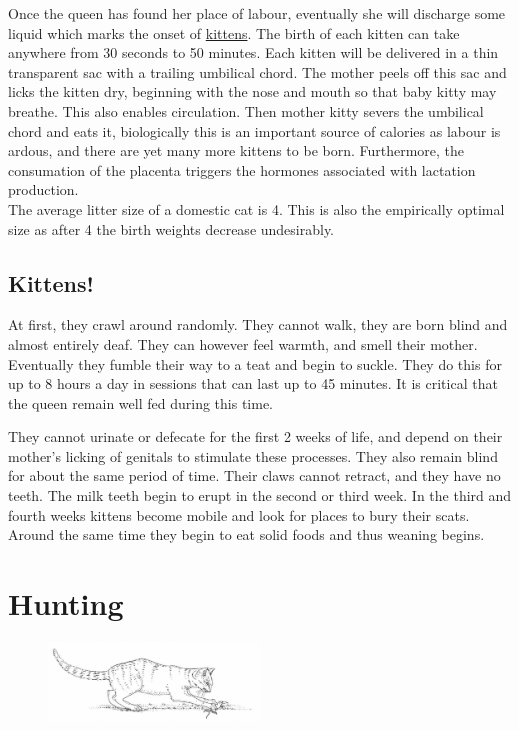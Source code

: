 \documentclass{article}
\begin{document}
\noindent{}Once the queen has found her place of labour, eventually she will discharge some liquid which marks the onset of \hyperref[sec:Kittens]{kittens}. The birth of each kitten can take anywhere from 30 seconds to 50 minutes. Each kitten will be delivered in a thin transparent sac with a trailing umbilical chord. The mother peels off this sac and licks the kitten dry, beginning with the nose and mouth so that baby kitty may breathe. This also enables circulation. Then mother kitty severs the umbilical chord and eats it, biologically this is an important source of calories as labour is ardous, and there are yet many more kittens to be born. Furthermore, the consumation of the placenta triggers the hormones associated with lactation production.\\

The average litter size of a domestic cat is 4. This is also the empirically optimal size as after 4 the birth weights decrease undesirably.


\subsection*{Kittens!}
\label{sec:Kittens}
At first, they crawl around randomly. They cannot walk, they are born blind and almost entirely deaf. They can however feel warmth, and smell their mother. Eventually they fumble their way to a teat and begin to suckle. They do this for up to 8 hours a day in sessions that can last up to 45 minutes. It is critical that the queen remain well fed during this time.

They cannot urinate or defecate for the first 2 weeks of life, and depend on their mother's licking of genitals to stimulate these processes. They also remain blind for about the same period of time. Their claws cannot retract, and they have no teeth. The milk teeth begin to erupt in the second or third week. In the third and fourth weeks kittens become mobile and look for places to bury their scats. Around the same time they begin to eat solid foods and thus weaning begins.

\section*{Hunting}

\begin{figure}[h]
    \centering
    \includegraphics[width=0.5\textwidth]{img/cat-hunter.png}
\end{figure}
\end{document}
